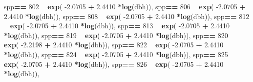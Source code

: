 \documentclass[
]{article}
\newenvironment{Shaded}{\begin{snugshade}}{\end{snugshade}}
\newcommand{\DecValTok}[1]{\textcolor[rgb]{0.00,0.00,0.81}{#1}}
\newcommand{\FloatTok}[1]{\textcolor[rgb]{0.00,0.00,0.81}{#1}}
\newcommand{\KeywordTok}[1]{\textcolor[rgb]{0.13,0.29,0.53}{\textbf{#1}}}
\newcommand{\NormalTok}[1]{#1}
\newcommand{\OperatorTok}[1]{\textcolor[rgb]{0.81,0.36,0.00}{\textbf{#1}}}
\newcommand{\StringTok}[1]{\textcolor[rgb]{0.31,0.60,0.02}{#1}}
\begin{document}
\begin{Shaded}
\begin{Highlighting}[]
\NormalTok{    spp}\OperatorTok{==}\StringTok{ }\DecValTok{802} \OperatorTok{~}\StringTok{ }\KeywordTok{exp}\NormalTok{( }\FloatTok{-2.0705}   \OperatorTok{+}\StringTok{    }\FloatTok{2.4410} \OperatorTok{*}\KeywordTok{log}\NormalTok{(dbh)),}
\NormalTok{    spp}\OperatorTok{==}\StringTok{ }\DecValTok{806} \OperatorTok{~}\StringTok{ }\KeywordTok{exp}\NormalTok{( }\FloatTok{-2.0705}   \OperatorTok{+}\StringTok{    }\FloatTok{2.4410} \OperatorTok{*}\KeywordTok{log}\NormalTok{(dbh)),}
\NormalTok{    spp}\OperatorTok{==}\StringTok{ }\DecValTok{808} \OperatorTok{~}\StringTok{ }\KeywordTok{exp}\NormalTok{( }\FloatTok{-2.0705}   \OperatorTok{+}\StringTok{    }\FloatTok{2.4410} \OperatorTok{*}\KeywordTok{log}\NormalTok{(dbh)),}
\NormalTok{    spp}\OperatorTok{==}\StringTok{ }\DecValTok{812} \OperatorTok{~}\StringTok{ }\KeywordTok{exp}\NormalTok{( }\FloatTok{-2.0705}   \OperatorTok{+}\StringTok{    }\FloatTok{2.4410} \OperatorTok{*}\KeywordTok{log}\NormalTok{(dbh)),}
\NormalTok{    spp}\OperatorTok{==}\StringTok{ }\DecValTok{813} \OperatorTok{~}\StringTok{ }\KeywordTok{exp}\NormalTok{( }\FloatTok{-2.0705}   \OperatorTok{+}\StringTok{    }\FloatTok{2.4410} \OperatorTok{*}\KeywordTok{log}\NormalTok{(dbh)),}
\NormalTok{    spp}\OperatorTok{==}\StringTok{ }\DecValTok{819} \OperatorTok{~}\StringTok{ }\KeywordTok{exp}\NormalTok{( }\FloatTok{-2.0705}   \OperatorTok{+}\StringTok{    }\FloatTok{2.4410} \OperatorTok{*}\KeywordTok{log}\NormalTok{(dbh)),}
\NormalTok{    spp}\OperatorTok{==}\StringTok{ }\DecValTok{820} \OperatorTok{~}\StringTok{ }\KeywordTok{exp}\NormalTok{( }\FloatTok{-2.2198}   \OperatorTok{+}\StringTok{    }\FloatTok{2.4410} \OperatorTok{*}\KeywordTok{log}\NormalTok{(dbh)),}
\NormalTok{    spp}\OperatorTok{==}\StringTok{ }\DecValTok{822} \OperatorTok{~}\StringTok{ }\KeywordTok{exp}\NormalTok{( }\FloatTok{-2.0705}   \OperatorTok{+}\StringTok{    }\FloatTok{2.4410} \OperatorTok{*}\KeywordTok{log}\NormalTok{(dbh)),}
\NormalTok{    spp}\OperatorTok{==}\StringTok{ }\DecValTok{824} \OperatorTok{~}\StringTok{ }\KeywordTok{exp}\NormalTok{( }\FloatTok{-2.0705}   \OperatorTok{+}\StringTok{    }\FloatTok{2.4410} \OperatorTok{*}\KeywordTok{log}\NormalTok{(dbh)),}
\NormalTok{    spp}\OperatorTok{==}\StringTok{ }\DecValTok{825} \OperatorTok{~}\StringTok{ }\KeywordTok{exp}\NormalTok{( }\FloatTok{-2.0705}   \OperatorTok{+}\StringTok{    }\FloatTok{2.4410} \OperatorTok{*}\KeywordTok{log}\NormalTok{(dbh)),}
\NormalTok{    spp}\OperatorTok{==}\StringTok{ }\DecValTok{826} \OperatorTok{~}\StringTok{ }\KeywordTok{exp}\NormalTok{( }\FloatTok{-2.0705}   \OperatorTok{+}\StringTok{    }\FloatTok{2.4410} \OperatorTok{*}\KeywordTok{log}\NormalTok{(dbh)),}

\end{Highlighting}
\end{Shaded}
\end{document}
